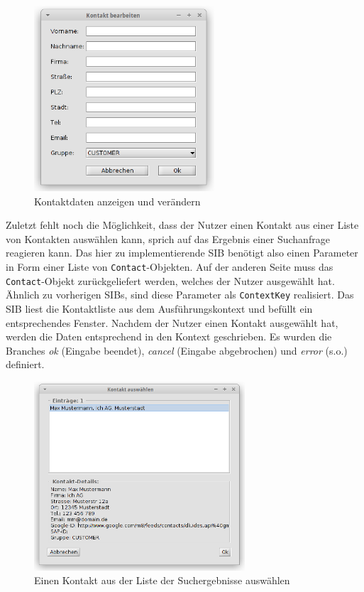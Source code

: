 \begin{figure}[h!t]
\begin{center}
\includegraphics[width=0.6\textwidth]{Bilder/Sib_EditContact_Frame.png}
\caption{Kontaktdaten anzeigen und verändern}
\label{fig:sibedit}
\end{center}
\end{figure}

Zuletzt fehlt noch die Möglichkeit, dass der Nutzer einen Kontakt aus einer Liste von Kontakten auswählen kann,
 sprich auf das Ergebnis einer Suchanfrage reagieren kann.
Das hier zu implementierende SIB benötigt also einen Parameter in Form einer Liste von \lstinline{Contact}-Objekten.
Auf der anderen Seite muss das \lstinline{Contact}-Objekt zurückgeliefert werden, welches der Nutzer ausgewählt hat.
Ähnlich zu vorherigen SIBs, sind diese Parameter als \lstinline{ContextKey} realisiert.
Das SIB liest die Kontaktliste aus dem Ausführungskontext und befüllt ein entsprechendes Fenster.
Nachdem der Nutzer einen Kontakt ausgewählt hat, werden die Daten entsprechend in den Kontext geschrieben.
Es wurden die Branches \emph{ok} (Eingabe beendet), \emph{cancel} (Eingabe abgebrochen) und \emph{error} (s.o.) definiert.

\begin{figure}[h!t]
\begin{center}
  \includegraphics[width=0.7\textwidth]{Bilder/Sib_ChooseContact_Frame.png}
  \caption{Einen Kontakt aus der Liste der Suchergebnisse auswählen}
  \label{fig:sibchoose}
\end{center}
\end{figure}

